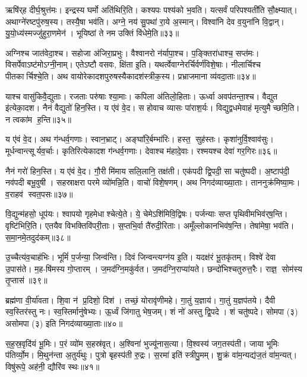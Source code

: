 ऋषि॑र्‌ह दीर्घ॒श्रुत्त॑मः। इन्द्रस्य घर्मो अति॑थिरि॒ति। 
कश्यपः पश्य॑को भ॒वति। यत्सर्वं परिपश्यती॑ति सौ॒क्ष्म्यात्‌। 
अथाग्ने॑रष्टपु॑रुष॒स्य। तस्यै॒षा भव॑ति। 
अग्ने॒ नय॑ सु॒पथा॑ रा॒ये अ॒स्मान्‌। विश्वा॑नि देव व॒युना॑नि वि॒द्वान्‌। 
यु॒यो॒ध्य॑स्मज्जु॑हुरा॒णमेन॑। भूयिष्ठां ते नम उक्तिं वि॑धेमे॒ति॥३३॥\anuvakamend


अग्निश्च जात॑वेदा॒श्च। सहोजा अ॑जिरा॒प्रभुः। वैश्वानरो न॑र्यापा॒श्च। 
प॒ङ्क्तिरा॑धाश्च॒ सप्त॑मः। विसर्पेवाऽष्ट॑मोऽग्नी॒नाम्‌। 
एतेऽष्टौ वसवः, क्षि॑ता इ॒ति। यथर्त्वेवाग्नेरर्चिर्वर्ण॑विशे॒षाः। 
नीलार्चिश्च पीतकार्चिश्चे॒ति। अथ वायोरेकादशपुरुषस्यैकादश॑स्त्रीक॒स्य। 
प्रभ्राजमाना व्य॑वदा॒ताः॥३४॥


याश्च वासु॑किवै॒द्युताः। रजताः परु॑षाः श्या॒माः। कपिला अ॑तिलो॒हिताः। 
ऊर्ध्वा अवप॑तन्ता॒श्च। वैद्युत इ॑त्येका॒दश। नैनं वैद्युतो॑ हिन॒स्ति। 
य ए॑वं वे॒द। स होवाच व्यासः पा॑राश॒र्यः। 
विद्युद्वधमेवाहं मृत्युमैच्छमि॒ति। न त्वका॑म ह॒न्ति॥३५॥


य ए॑वं वे॒द। अथ ग॑न्धर्व॒गणाः। स्वान॒भ्राट्‌। 
अङ्घा॑रि॒र्बम्भा॑रिः। हस्त॒ सुह॑स्तः। कृशा॑नुर्वि॒श्वाव॑सुः। 
मूर्धन्वान्त्सूर्यव॒र्चाः। कृतिरित्येकादश ग॑न्धर्व॒गणाः। 
देवाश्च म॑हादे॒वाः। रश्मयश्च देवा॑ गर॒गिरः॥३६॥


नैनं गरो॑ हिन॒स्ति। य ए॑वं वे॒द। 
गौ॒री मि॑माय सलि॒लानि॒ तक्ष॑ती। एक॑पदी द्वि॒पदी॒ सा चतु॑ष्पदी। 
अ॒ष्टाप॑दी॒ नव॑पदी बभू॒वुषी। सहस्राक्षरा परमे व्यो॑मन्नि॒ति। 
वाचो॑ विशे॒षणम्‌। अथ निगद॑व्याख्या॒ताः। 
ताननुक्र॑मिष्या॒मः। व॒राहव॑ स्वत॒पसः॥३७॥

वि॒द्युन्म॑हसो॒ धूप॑यः। श्वापयो गृहमेधाश्चेत्ये॒ते। 
ये॒ चेमेऽशि॑मिवि॒\-द्विषः। पर्जन्याः सप्त पृथिवीमभिव॑र्‌ष॒न्ति। 
वृष्टि॑भिरि॒ति। एतयैव विभक्तिवि॑परी॒ताः। स॒प्तभि॒र्वा तै॑रुदी॒रिताः। 
अमूँल्लोकान\-भिव॑\ur{}ष॒न्ति। तेषा॑मेषा॒ भव॑ति। स॒मा॒नमे॒तदुद॑कम्‌॥३८॥

उ॒च्चैत्य॑व॒चाह॑भिः। भूमिं॑ प॒र्जन्या॒ जिन्व॑न्ति। दिवं जिन्वन्त्यग्न॑य इ॒ति। 
यदक्ष॑रं भू॒तकृ॑तम्‌। विश्वे॑ देवा उ॒पास॑ते। म॒ह\ur-\hspace{-0.5ex}\mbox{षि॑मस्य} गो॒प्तारम्। 
ज॒मद॑ग्नि॒मकु॑र्वत। ज॒मद॑ग्नि॒राप्या॑यते। 
छन्दो॑भिश्चतुरुत्त॒रैः। राज्ञ॒ सोम॑स्य तृ॒प्तास॑॥३९॥

ब्रह्म॑णा वी॒र्या॑वता। शि॒वा न॑ प्र॒दिशो॒ दिश॑। 
तच्छं॒ योरावृ॑णीमहे। गा॒तुं य॒ज्ञाय॑। गा॒तुं य॒ज्ञप॑तये। 
दैवी स्व॒स्तिर॑स्तु नः। स्व॒स्तिर्मानु॑षेभ्यः। ऊ॒र्ध्वं जि॑गातु भेष॒जम्। 
शं नो॑ अस्तु द्वि॒पदे। शं चतु॑ष्पदे। 
सोमपा (३) असोमपा (३) इति निगद॑व्याख्या॒ताः॥४०॥\anuvakamend


स॒ह॒स्र॒वृदि॑यं भू॒मिः। प॒रं व्यो॑म स॒हस्र॑वृत्‌। अ॒श्विना॑ भुज्यू॑नास॒त्या। 
वि॒श्वस्य॑ जग॒तस्प॑ती। जाया भूमिः प॑तिर्व्यो॒म। मि॒थुन॑न्ता अ॒तुर्य॑थुः। 
पुत्रो बृहस्प॑ती रु॒द्रः। स॒रमा॑ इति॑ स्त्रीपु॒मम्‌। 
शु॒क्रं वा॑म॒न्यद्य॑ज॒तं वा॑म॒न्यत्‌। विषु॑रूपे॒ अह॑नी॒ द्यौरि॑व स्थः॥४१॥



